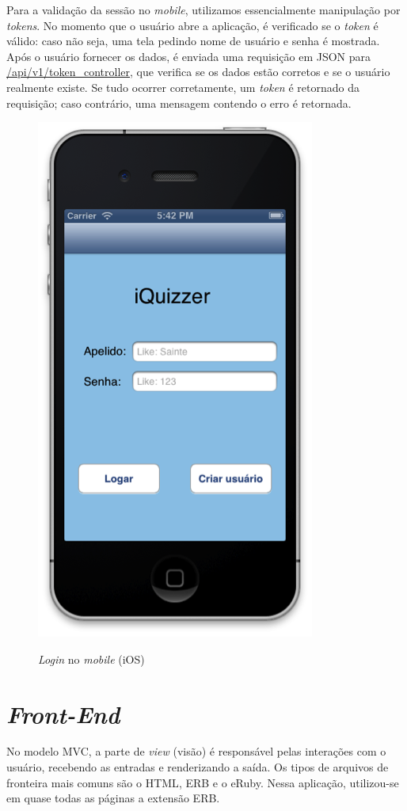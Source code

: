     Para a validação da sessão no \emph{mobile}, utilizamos essencialmente manipulação por \emph{tokens}. No momento que o usuário abre a aplicação, é verificado se o \emph{token} é válido: caso não seja, uma tela pedindo nome de usuário e senha é mostrada. Após o usuário fornecer os dados, é enviada uma requisição em \ac{JSON} para \url{/api/v1/token_controller}, que verifica se os dados estão corretos e se o usuário realmente existe. Se tudo ocorrer corretamente, um \emph{token} é retornado da requisição; caso contrário, uma mensagem contendo o erro é retornada.
	 \begin{figure}[H]
	   \centering
	   \includegraphics{figs/ioslogin.png}\\
	   \caption{ \emph{Login} no \emph{mobile} (iOS) }
	   \label{FIG:iOSlogin}
	 \end{figure}

    \section{\emph{Front-End}}
            No modelo \ac{MVC}, a parte de \emph{view} (visão) é responsável pelas interações com o usuário, recebendo as entradas e renderizando a saída. Os tipos de arquivos de fronteira mais comuns são o \ac{HTML}, ERB e o eRuby. Nessa aplicação, utilizou-se em quase todas as páginas a extensão ERB.
			
